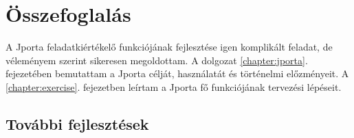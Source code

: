 \chapter*{Összefoglalás}

A Jporta feladatkiértékelő funkciójának fejlesztése igen komplikált feladat, de véleményem szerint sikeresen megoldottam.
A dolgozat \ref{chapter:jporta}. fejezetében bemutattam a Jporta célját, használatát és történelmi előzményeit.
A \ref{chapter:exercise}. fejezetben leírtam a Jporta fő funkciójának tervezési lépéseit.

\section*{További fejlesztések}
